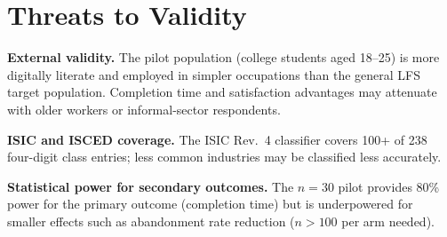 \begin{table}[htbp]
\centering
\caption{Cross-objective summary: component-level targets achieved; pilot-dependent targets pending final phase.}
\label{tab:ch6-objectives}
\footnotesize\renewcommand{\arraystretch}{1.4}
\end{table}

\section{Threats to Validity}
\label{sec:res-validity}

\textbf{External validity.}
The pilot population (college students aged 18--25) is more digitally literate
and employed in simpler occupations than the general LFS target population.
Completion time and satisfaction advantages may attenuate with older workers
or informal-sector respondents.

\textbf{ISIC and ISCED coverage.}
The ISIC Rev.~4 classifier covers 100+ of 238 four-digit class entries; less
common industries may be classified less accurately.

\textbf{Statistical power for secondary outcomes.}
The $n=30$ pilot provides 80\% power for the primary outcome (completion time)
but is underpowered for smaller effects such as abandonment rate reduction
($n>100$ per arm needed).
